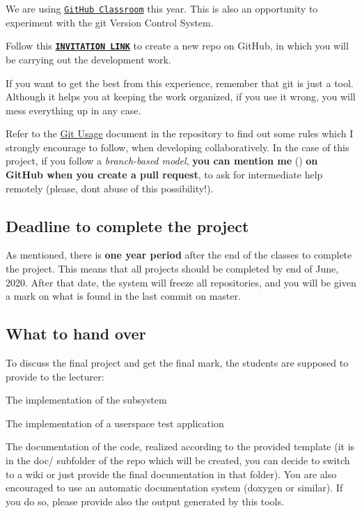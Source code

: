 We are using \href{https://classroom.github.com/}{\tt Git\+Hub Classroom} this year. This is also an opportunity to experiment with the git Version Control System.

Follow this {\bfseries \href{https://classroom.github.com/a/j0yfI-y4}{\tt I\+N\+V\+I\+T\+A\+T\+I\+ON L\+I\+NK}} to create a new repo on Git\+Hub, in which you will be carrying out the development work.

If you want to get the best from this experience, remember that git is just a tool. Although it helps you at keeping the work organized, if you use it wrong, you will mess everything up in any case.

Refer to the \hyperlink{md_git_usage}{Git Usage} document in the repository to find out some rules which I strongly encourage to follow, when developing collaboratively. In the case of this project, if you follow a {\itshape branch-\/based model}, {\bfseries you can mention me} () {\bfseries on Git\+Hub when you create a pull request}, to ask for intermediate help remotely (please, don\textquotesingle{}t abuse of this possibility!).

\subsection*{Deadline to complete the project}

As mentioned, there is {\bfseries one year period} after the end of the classes to complete the project. This means that all projects should be completed by end of June, 2020. After that date, the system will freeze all repositories, and you will be given a mark on what is found in the last commit on {\ttfamily master}.

\subsection*{What to hand over}

To discuss the final project and get the final mark, the students are supposed to provide to the lecturer\+:


\begin{DoxyItemize}
\item The implementation of the subsystem
\item The implementation of a userspace test application
\item The documentation of the code, realized according to the provided template (it is in the {\ttfamily doc/} subfolder of the repo which will be created, you can decide to switch to a wiki or just provide the final documentation in that folder). You are also encouraged to use an automatic documentation system (doxygen or similar). If you do so, please provide also the output generated by this tools.
\end{DoxyItemize}

